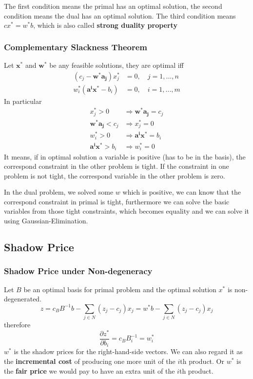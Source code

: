 						The first condition means the primal has an optimal solution, the second condition means the dual has an optimal solution. The third condition means $cx^*=w^*b$, which is also called \textbf{strong duality property}\\

					\subsubsection{Complementary Slackness Theorem}
						Let $\bm{x^*}$ and $\bm{w^*}$ be any feasible solutions, they are optimal iff
						\begin{align}
							(c_j - \bm{w^*}\bm{a_j})x_j^* &= 0, \quad j = 1,...,n \\
							w_i^*(\bm{a^i}\bm{x^*} - b_i) &= 0, \quad i = 1,...,m
						\end{align}
						In particular
						\begin{align}
							x_j^*>0 &\Rightarrow \bm{w^*}\bm{a_j} = c_j  \\
							\bm{w^*}\bm{a_j} < c_j &\Rightarrow x_j^* = 0  \\
							w_i^* >0 &\Rightarrow \bm{a^i}\bm{x^*} = b_i  \\
							\bm{a^i}\bm{x^*} > b_i &\Rightarrow w_i^*=0
						\end{align}
						It means, if in optimal solution a variable is positive (has to be in the basis), the correspond constraint in the other problem is tight. If the constraint in one problem is not tight, the correspond variable in the other problem is zero.

						In the dual problem, we solved some $w$ which is positive, we can know that the correspond constraint in primal is tight, furthermore we can solve the basic variables from those tight constraints, which becomes equality and we can solve it using Gaussian-Elimination.

				\subsection{Shadow Price}
					\subsubsection{Shadow Price under Non-degeneracy}
						Let $B$ be an optimal basis for primal problem and the optimal solution $x^*$ is non-degenerated.
						\begin{equation}
							z=c_BB^{-1}b - \sum_{j\in N}(z_j - c_j)x_j = w^*b - \sum_{j\in N}(z_j - c_j)x_j 
						\end{equation}
						therefore
						\begin{equation}
							\frac{\partial z^*}{\partial b_i} = c_BB^{-1}_i = w_i^* 
						\end{equation}
						$w^*$ is the shadow prices for the right-hand-side vectors. We can also regard it as the \textbf{incremental cost} of producing one more unit of the $i$th product. Or $w^*$ is the \textbf{fair price} we would pay to have an extra unit of the $i$th product.

